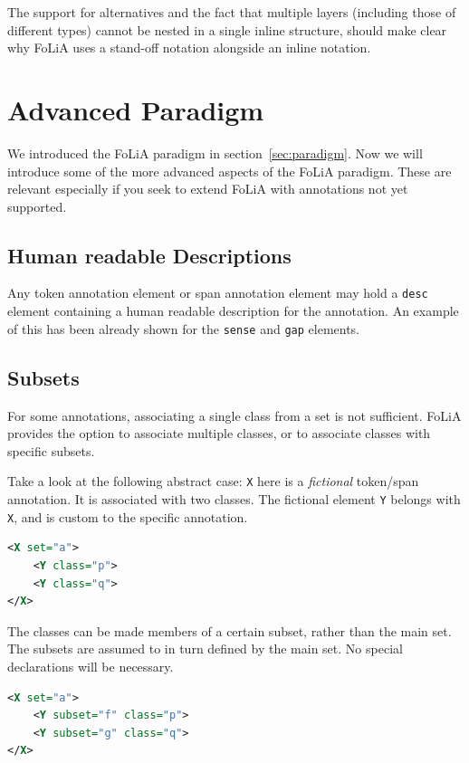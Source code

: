 \documentclass[a4paper,12pt]{report}
\begin{document}
The support for alternatives and the fact that multiple layers (including those of different types) cannot be nested in a single inline structure, should make clear why FoLiA uses a stand-off notation alongside an inline notation. 


\section{Advanced Paradigm}
\label{sec:advparadigm}

We introduced the FoLiA paradigm in section~\ref{sec:paradigm}. Now we will introduce some of the more advanced aspects of the FoLiA paradigm. These are relevant especially if you seek to extend FoLiA with annotations not yet supported.

\subsection{Human readable Descriptions}

Any token annotation element or span annotation element may hold a \texttt{desc} element containing a human readable description for the annotation. An example of this has been already shown for the \texttt{sense} and \texttt{gap} elements.

\subsection{Subsets}

For some annotations, associating a single class from a set is not sufficient. FoLiA provides the option to associate multiple classes, or to associate classes with specific subsets. 

Take a look at the following abstract case: \texttt{X} here is a \emph{fictional} token/span annotation. It is associated with two classes. The fictional element \texttt{Y} belongs with \texttt{X}, and is custom to the specific annotation.

\begin{lstlisting}[language=xml]
<X set="a">
    <Y class="p">
    <Y class="q">
</X>
\end{lstlisting}

The classes can be made members of a certain subset, rather than the main set. The subsets are assumed to in turn defined by the main set. No special declarations will be necessary.

\begin{lstlisting}[language=xml]
<X set="a">
    <Y subset="f" class="p">
    <Y subset="g" class="q">
</X>
\end{lstlisting}
\end{document}
